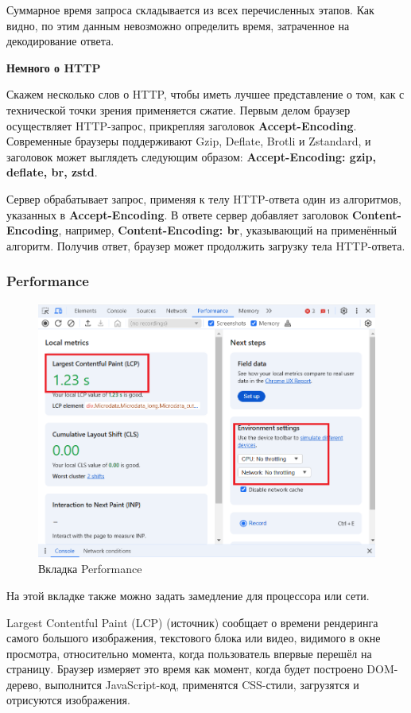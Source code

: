 \documentclass[12pt]{article}
\begin{document}
Суммарное время запроса складывается из всех перечисленных этапов.
Как видно, по этим данным невозможно определить время,
затраченное на декодирование ответа.

\textbf{Немного о HTTP}

Скажем несколько слов о HTTP, чтобы иметь лучшее представление
о том, как с технической точки зрения применяется сжатие.
Первым делом браузер осуществляет HTTP-запрос, прикрепляя заголовок \textbf{Accept-Encoding}.
Современные браузеры поддерживают Gzip, Deflate, Brotli и Zstandard,
и заголовок может выглядеть следующим образом:
\textbf{Accept-Encoding: gzip, deflate, br, zstd}.

Сервер обрабатывает запрос, применяя к телу HTTP-ответа один из алгоритмов,
указанных в \textbf{Accept-Encoding}. В ответе сервер добавляет заголовок \textbf{Content-Encoding},
например, \textbf{Content-Encoding: br}, указывающий на применённый алгоритм.
Получив ответ, браузер может продолжить загрузку тела HTTP-ответа.

\subsubsection{Performance}

\begin{figure}[H]
    \centering
    \includegraphics[width=1\textwidth]{../images/performance.png}
    \caption{Вкладка Performance}
\end{figure}

На этой вкладке также можно задать замедление для процессора или сети.

Largest Contentful Paint (LCP) (источник)
сообщает о времени рендеринга самого большого изображения, текстового блока или видео,
видимого в окне просмотра, относительно момента, когда пользователь впервые перешёл на страницу.
Браузер измеряет это время как момент, когда будет построено DOM-дерево,
выполнится JavaScript-код, применятся CSS-стили, загрузятся и отрисуются изображения.
\end{document}
